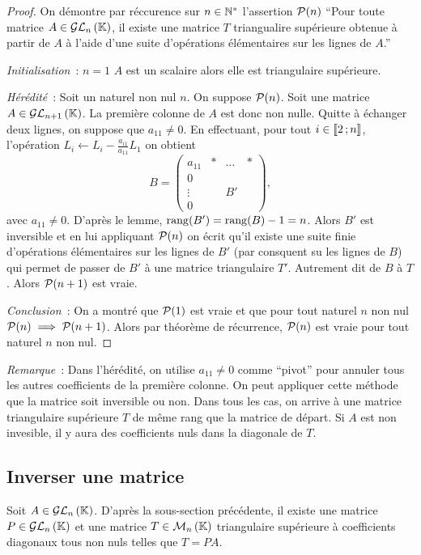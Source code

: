 \begin{proof}
  On démontre par réccurence sur \(n \in \N^*\) l'assertion \(\P(n)\) ``Pour toute matrice \(A \in \GLn{n}{\K}\), il existe une matrice \(T\) triangualire supérieure obtenue à partir de \(A\) à l'aide d'une suite d'opérations élémentaires sur les lignes de \(A\).''

\emph{Initialisation}~: \(n = 1\) \(A\) est un scalaire alors elle est triangulaire supérieure.

\emph{Hérédité}~: Soit un naturel non nul \(n\). On suppose \(\P(n)\). Soit une matrice \(A \in \GLn{n+1}{\K}\). La première colonne de \(A\) est donc non nulle. Quitte à échanger deux lignes, on suppose que \(a_{11}\neq 0\). En effectuant, pour tout \(i \in \intervalleentier{2}{n}\), l'opération \(L_i \leftarrow L_i -\frac{a_{i1}}{a_{11}}L_1\) on obtient
\begin{equation}
  B = \begin{pmatrix}
      a_{11} & * & \ldots & * \\
      0 & & & \\
      \vdots & & B' & \\
      0 & & & 
    \end{pmatrix},
\end{equation}
avec \(a_{11}\neq 0\). D'après le lemme, \(\rg(B')=\rg(B)-1 = n\). Alors \(B'\) est inversible et en lui appliquant \(\P(n)\) on écrit qu'il existe une suite finie d'opérations élémentaires sur les lignes de \(B'\) (par consquent su les lignes de \(B\)) qui permet de passer de \(B'\) à une matrice triangulaire \(T'\). Autrement dit de \(B\) à \(T\). Alors \(\P(n+1)\) est vraie.

\emph{Conclusion}~: On a montré que \(\P(1)\) est vraie et que pour tout naturel \(n\) non nul \(\P(n) \implies \P(n+1)\). Alors par théorème de récurrence, \(\P(n)\) est vraie pour tout naturel \(n\) non nul.
\end{proof}

\emph{Remarque}~: Dans l'hérédité, on utilise \(a_{11}\neq 0\) comme ``pivot'' pour annuler tous les autres coefficients de la première colonne. On peut appliquer cette méthode que la matrice soit inversible ou non. Dans tous les cas, on arrive à  une matrice triangulaire supérieure \(T\) de même rang que la matrice de départ. Si \(A\) est non invesible, il y aura des coefficients nuls dans la diagonale de \(T\).

\subsection{Inverser une matrice}
Soit \(A \in \GLn{n}{\K}\). D'après la sous-section précédente, il existe une matrice \(P \in \GLn{n}{\K}\) et une matrice \(T \in \Mn{n}{\K}\) triangulaire supérieure à coefficients diagonaux tous non nuls telles que \(T = PA\).


